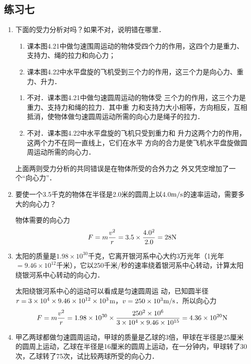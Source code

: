 \subsection{练习七}
\begin{enumerate}
	\item 下面的受力分析对吗？如果不对，说明错在哪里．
	\begin{enumerate}
		\item 课本图4.21中做匀速围周运动的物体受四个力的作用，这四个力是重力、支持力、绳的拉力和向心力；
		\item 课本图4.22中水平盘旋的飞机受到三个力的作用，这三个力是向心力、重力、升力．
	\end{enumerate}

    \begin{solution}
 \begin{enumerate}
     \item 不对．课本图4.21中做匀速圆周运动的物体受
     三个力的作用，这三个力是重力、支持力和绳的拉力．其中重
     力和支持力大小相等，方向相反，互相抵消，使物体做匀速圆周运动所需的向心力是绳子的拉力．
     \item 不对．课本图4.22中水平盘旋的飞机只受到重力和
     升力这两个力的作用，这两个力不在同一直线上，它们在水平
     方向的合力是使飞机水平盘旋做圆周运动所需的向心力．
 \end{enumerate}
     上面两则受力分析的共同错误是在物体所受的合外力之
     外又凭空增加了一个“向心力”．
    \end{solution}
\item 要使一个3.5千克的物体在半径是2.0米的圆周上以4.0$\text{m}/\text{s}$的速率运动，需要多大的向心力？

\begin{solution}
    物体需要的向心力
\[F=m\frac{v^2}{r}=3.5\times \frac{4.0^2}{2.0}=28{\rm N}\]
\end{solution}
\item 太阳的质量是$1.98\times 10^{30}$千克，它离开银河系中心大约3万光年（1光年$=9.46\times 10^{12}$千米），它以250千米/秒的速率绕着银河系中心转动，计算太阳绕银河系中心转动的向心力．

\begin{solution}
    太阳绕银河系中心的运动可以看成是匀速圆周运
    动，已知圆半径$r=3\times10^4\times9.46\times10^{12}\times10^3$m，$v=250\times10^3\text{m}/\text{s}$．所以向心力
\[F=m\frac{v^2}{r}=1.98\times 10^{30}\times \frac{250^2\times 10^6}{3\times 10^4\times 9.46\times 10^{15}}=4.36\times 10^{20}{\rm N}\]
\end{solution}
\item 甲乙两球都做匀速圆周运动，甲球的质量是乙球的3倍，甲球在半径是25厘米的圆周上运动，乙球在半径是16厘米的圆周上运动，在一分钟内，甲球转了30次，乙球转了75次，试比较两球所受的向心力．


\end{enumerate}
